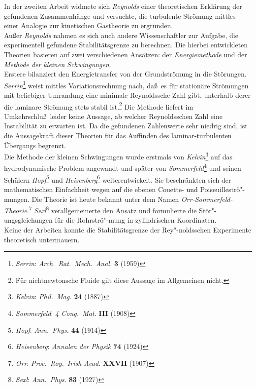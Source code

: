 \documentclass[10pt,a5paper,oneside,draft]{book}
\numberwithin{equation}{chapter}
\begin{document}
In der zweiten Arbeit widmete sich \textsl{Reynolds} einer theoretischen Erkl\"arung der gefundenen Zusammenh\"ange und versuchte, die turbulente Str\"omung mittles einer Analogie zur kinetischen Gastheorie zu ergr\"unden.\\
Au\ss er \textsl{Reynolds} nahmen es sich auch andere Wissenschaftler zur Aufgabe, die experimentell gefundene Stabilit\"atsgrenze zu berechnen.
Die hierbei entwickleten Theorien basieren auf zwei verschiedenen Ans\"atzen:
der \textit{Energiemethode} und der \textit{Methode der kleinen Schwingungen}.\\
Erstere bilanziert den Energietransfer von der Grundstr\"omung in die St\"orungen.
\textsl{Serrin}\footnote{\label{bib:serrin}\textsl{Serrin}: \textit{Arch.\ Rat.\ Mech.\ Anal.} \textbf{3} (1959)}
weist mittles Variationsrechnung nach, da\ss\ es f\"ur station\"are Str\"omungen mit beliebiger Umrandung eine minimale Reynoldssche Zahl gibt, unterhalb derer die laminare Str\"omung stets stabil ist.\footnote{F\"ur nichtnewtonsche Fluide gilt diese Aussage im Allgemeinen nicht.}
Die Methode liefert im Umkehrschlu\ss\ leider keine Aussage, ab welcher Reynoldsschen Zahl eine Instabilit\"at zu erwarten ist.
Da die gefundenen Zahlenwerte sehr niedrig sind, ist die Aussagekraft dieser Theorien f\"ur das Auffinden des laminar-turbulenten \"Ubergangs begrenzt.\\
Die Methode der kleinen Schwingungen wurde erstmals von \textsl{Kelvin}\footnote{\label{bib:kelvin}\textsl{Kelvin}: \textit{Phil.\ Mag.} \textbf{24} (1887)}
auf das hydrodynamische Problem angewandt und sp\"ater von \textsl{Sommerfeld}\footnote{\label{bib:sommerfeld_congresso}\textsl{Sommerfeld}: \textit{4 Cong.\ Mat.} \textbf{III} (1908)}
und seinen Sch\"ulern \textsl{Hopf}\footnote{\label{bib:hopf}\textsl{Hopf}: \textit{Ann.\ Phys.} \textbf{44} (1914)}
und \textsl{Heisenberg}\footnote{\label{bib:heisenberg}\textsl{Heisenberg}: \textit{Annalen der Physik} \textbf{74} (1924)}
weiterentwickelt.
Sie beschr\"ankten sich der mathematischen Einfachheit wegen auf die ebenen Couette- und Poiseuillestr\"o"-mungen.
Die Theorie ist heute bekannt unter dem Namen \textit{Orr-Sommerfeld-\!Theorie}.\footnote{\label{bib:orr}\textsl{Orr}: \textit{Proc.\ Roy.\ Irish Acad.} \textbf{XXVII} (1907)}
\textsl{Sexl}\footnote{\label{bib:sexl}\textsl{Sexl}: \textit{Ann.\ Phys.} \textbf{83} (1927)}
verallgemeinerte den Ansatz und formulierte die St\"or"-ungsgleichungen f\"ur die Rohrstr\"o"-mung in zylindrischen Koordinaten.\\
Keine der Arbeiten konnte die Stabilit\"atsgrenze der Rey"-noldsschen Experimente theoretisch untermauern.
\end{document}
